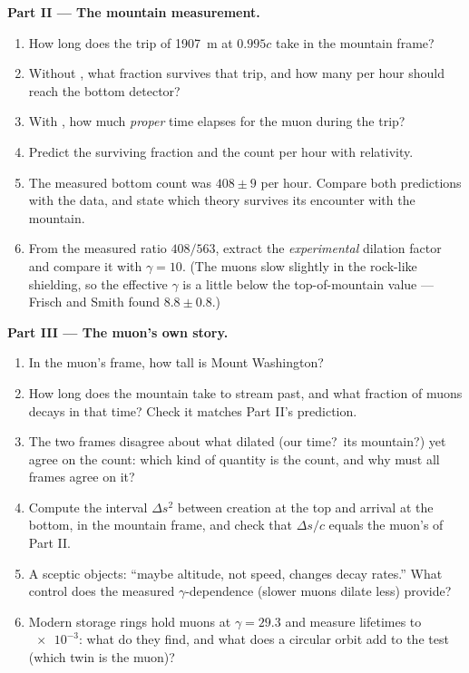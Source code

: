 \begin{problem}
\medskip\noindent\textbf{Part II --- The mountain measurement.}
\begin{enumerate}[resume]
  \item How long does the trip of \qty{1907}{m} at $0.995c$ take in
        the mountain frame?
  \item Without , what fraction survives that trip, and
        how many per hour should reach the bottom detector?
  \item With , how much \emph{proper} time elapses for
        the muon during the trip?
  \item Predict the surviving fraction and the count per hour with
        relativity.
  \item The measured bottom count was $408 \pm 9$ per hour. Compare
        both predictions with the data, and state which theory
        survives its encounter with the mountain.
  \item From the measured ratio $408/563$, extract the
        \emph{experimental} dilation factor and compare it with
        $\gamma = 10$. (The muons slow slightly in the rock-like
        shielding, so the effective $\gamma$ is a little below the
        top-of-mountain value --- Frisch and Smith found $8.8 \pm
        0.8$.)
\end{enumerate}

\medskip\noindent\textbf{Part III --- The muon's own story.}
\begin{enumerate}[resume]
  \item In the muon's frame, how tall is Mount Washington?
  \item How long does the mountain take to stream past, and what
        fraction of muons decays in that time? Check it matches
        Part II's prediction.
  \item The two frames disagree about what dilated (our time?\ its
        mountain?) yet agree on the count: which kind of quantity is
        the count, and why must all frames agree on it?
  \item Compute the interval $\Delta s^2$ between creation at the top
        and arrival at the bottom, in the mountain frame, and check
        that $\Delta s/c$ equals the muon's  of Part II.
  \item A sceptic objects: ``maybe altitude, not speed, changes decay
        rates.'' What control does the measured $\gamma$-dependence
        (slower muons dilate less) provide?
  \item Modern storage rings hold muons at $\gamma = 29.3$ and
        measure lifetimes to $\num{e-3}$: what do they find, and what
        does a circular orbit add to the test (which twin is the
        muon)?
\end{enumerate}


\end{problem}
